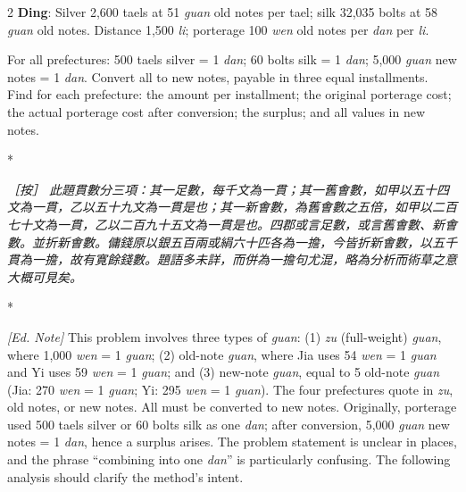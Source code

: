\documentclass[11pt,a4paper]{article}
\newcommand{\CnEditorial}[1]{\par\noindent\textcolor{editorialcolor}{\textit{［按］#1}}\par\vspace{0.5ex}}
\newcommand{\EnEditorial}{\par\noindent\textcolor{editorialcolor}{\textit{[Ed. Note] }}\ignorespaces}
\newcommand{\switchCn}{\switchcolumn[0]*}
\newcommand{\switchEn}{\switchcolumn[1]*}
\begin{document}
\begin{paracol}{2}
\textbf{Ding}: Silver 2,600 taels at 51 \textit{guan} old notes per tael; silk 32,035 bolts at 58 \textit{guan} old notes. Distance 1,500 \textit{li}; porterage 100 \textit{wen} old notes per \textit{dan} per \textit{li}.

For all prefectures: 500 taels silver = 1 \textit{dan}; 60 bolts silk = 1 \textit{dan}; 5,000 \textit{guan} new notes = 1 \textit{dan}. Convert all to new notes, payable in three equal installments. Find for each prefecture: the amount per installment; the original porterage cost; the actual porterage cost after conversion; the surplus; and all values in new notes.

\switchCn

\CnEditorial{%
此題貫數分三項：其一足數，每千文為一貫；其一舊㑹數，如甲以五十四文為一貫，乙以五十九文為一貫是也；其一新㑹數，為舊㑹數之五倍，如甲以二百七十文為一貫，乙以二百九十五文為一貫是也。四郡或言足數，或言舊㑹數、新㑹數。並折新㑹數。傭錢原以銀五百兩或絹六十匹各為一擔，今皆折新㑹數，以五千貫為一擔，故有寛餘錢數。題語多未詳，而併為一擔句尤混，略為分析而術草之意大概可見矣。
}

\switchEn

\EnEditorial
This problem involves three types of \textit{guan}: (1) \textit{zu} (full-weight) \textit{guan}, where 1,000 \textit{wen} = 1 \textit{guan}; (2) old-note \textit{guan}, where Jia uses 54 \textit{wen} = 1 \textit{guan} and Yi uses 59 \textit{wen} = 1 \textit{guan}; and (3) new-note \textit{guan}, equal to 5 old-note \textit{guan} (Jia: 270 \textit{wen} = 1 \textit{guan}; Yi: 295 \textit{wen} = 1 \textit{guan}). The four prefectures quote in \textit{zu}, old notes, or new notes. All must be converted to new notes. Originally, porterage used 500 taels silver or 60 bolts silk as one \textit{dan}; after conversion, 5,000 \textit{guan} new notes = 1 \textit{dan}, hence a surplus arises. The problem statement is unclear in places, and the phrase ``combining into one \textit{dan}'' is particularly confusing. The following analysis should clarify the method's intent.

\end{paracol}
\end{document}

